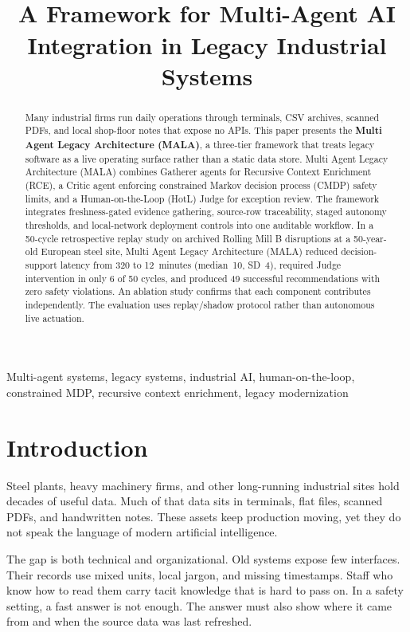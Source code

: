 \documentclass[conference]{IEEEtran}
\title{\MALA\\
\large A Framework for Multi-Agent AI Integration in Legacy Industrial Systems}
\author{
  \IEEEauthorblockN{Sagnik Mukherjee}
  \IEEEauthorblockA{Independent Researcher\\
    \href{https://orcid.org/0009-0002-4111-6299}{ORCID: 0009-0002-4111-6299}}
}
\newcommand{\MALA}{Multi Agent Legacy Architecture (MALA)}
\begin{document}
\maketitle


\begin{abstract}
Many industrial firms run daily operations through terminals, CSV archives, scanned PDFs, and local shop-floor notes that expose no APIs. This paper presents the \textbf{\MALA{}}, a three-tier framework that treats legacy software as a live operating surface rather than a static data store. \MALA{} combines Gatherer agents for Recursive Context Enrichment (RCE), a Critic agent enforcing constrained Markov decision process (CMDP) safety limits, and a Human-on-the-Loop (HotL) Judge for exception review. The framework integrates freshness-gated evidence gathering, source-row traceability, staged autonomy thresholds, and local-network deployment controls into one auditable workflow. In a 50-cycle retrospective replay study on archived Rolling Mill B disruptions at a 50-year-old European steel site, \MALA{} reduced decision-support latency from 320 to 12~minutes (median~10, SD~4), required Judge intervention in only 6 of 50 cycles, and produced 49 successful recommendations with zero safety violations. An ablation study confirms that each component contributes independently. The evaluation uses replay/shadow protocol rather than autonomous live actuation.
\end{abstract}

\begin{IEEEkeywords}
Multi-agent systems, legacy systems, industrial AI, human-on-the-loop, constrained MDP, recursive context enrichment, legacy modernization
\end{IEEEkeywords}

\section{Introduction}

Steel plants, heavy machinery firms, and other long-running industrial sites hold decades of useful data. Much of that data sits in terminals, flat files, scanned PDFs, and handwritten notes. These assets keep production moving, yet they do not speak the language of modern artificial intelligence.

The gap is both technical and organizational. Old systems expose few interfaces. Their records use mixed units, local jargon, and missing timestamps. Staff who know how to read them carry tacit knowledge that is hard to pass on. In a safety setting, a fast answer is not enough. The answer must also show where it came from and when the source data was last refreshed.
\end{document}
